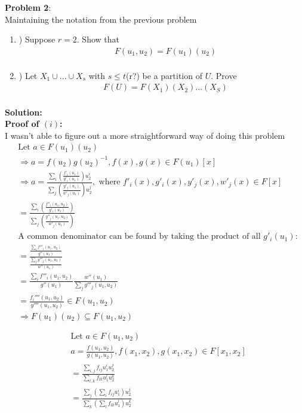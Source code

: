 \documentclass[11pt]{article}
\newcommand{\prob}[3]{\begin{flushleft}
        \textbf{Problem #1}: \\
        #2 
		\textbf{Solution:}\\ 
		#3

\end{flushleft}}
\begin{document}
\prob{2}{
Maintaining the notation from the previous problem
\begin{enumerate}[i]
\item) Suppose $r = 2$. Show that 
\begin{align*}
&F(u_1, u_2) = F(u_1)(u_2)\\
\end{align*}
\item) Let $X_1 \cup ... \cup X_s$ with $s \leq t$(r?) be a partition of $U$. Prove
\begin{align*}
&F(U) = F(X_1)(X_2)...(X_S)\\
\end{align*}
\end{enumerate}
}{
\textbf{Proof of $(i)$:}\\
I wasn't able to figure out a more straightforward way of doing this problem
\begin{align*}
&\text{Let }a \in F(u_1)(u_2)\\
&\Rightarrow a = f(u_2)g(u_2)^{-1}, f(x), g(x) \in F(u_1)[x]\\
&\Rightarrow a = \frac{\sum_i \left( \frac{f'_i(u_1)}{g'_i(u_1)} \right) u_2^i}{ \sum_j \left( \frac{y'_j(u_1)}{w'_j(u_1)} \right) u_2^j}, \text{ where }f'_i(x), g'_i(x), y'_j(x), w'_j(x) \in F[x]\\
& = \frac{\sum_i \left( \frac{f''_i(u_1, u_2)}{g'_i(u_1)} \right)}{ \sum_j \left( \frac{y''_j(u_1, u_2)}{w'_j(u_1)} \right)}\\
&\text{A common denominator can be found by taking the product of all $g'_i(u_1)$}:\\
& = \frac{ \frac{\sum_i f'''_i(u_1, u_2)}{g''(u_1)} }{\frac{\sum_j  y'''_j(u_1, u_2)}{w''(u_1)}}\\
& = \frac{\sum_i f'''_i(u_1, u_2)}{g''(u_1)} \frac{w''(u_1)}{\sum_j  y'''_j(u_1, u_2)}\\
& = \frac{f_i''''(u_1, u_2)}{y''''(u_1, u_2)} \in F(u_1, u_2)\\
&\Rightarrow F(u_1)(u_2) \subseteq F(u_1, u_2)\\\\
\end{align*}
\begin{align*}
&\text{Let }a \in F(u_1, u_2)\\
&a = \frac{f(u_1, u_2)}{g(u_1, u_2)}, f(x_1, x_2), g(x_1, x_2) \in F[x_1, x_2]\\
& = \frac{\sum_{i, j} f_{ij}u_1^iu_2^j }{\sum_{l, k} f_{lk}u_1^lu_2^k}\\
& =  \frac{\sum_{j} \left( \sum_i f_{ij}u_1^i \right) u_2^j }{\sum_{k} \left( \sum_l f_{lk}u_1^l \right) u_2^k}\\

\end{align*}}
\end{document}

